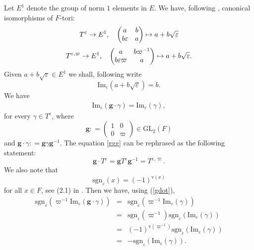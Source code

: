 \documentclass[11pt]{amsart}
\numberwithin{equation}{section}
\def\g{\mathbf{g}}
\def\sgn{\mathrm{sgn}}
\def\val{\mathrm{v}}
\def\GL{\mathrm{GL}}
\def\g{\mathbf{g}}
\newcommand{\<}{\left\langle}
\renewcommand{\>}{\right\rangle}
\begin{document}
Let $E^1$ denote the group of norm $1$ elements in $E$.   We have, following \cite[\S3.1]{ADSS}, canonical isomorphisms of $F$-tori:
\[
T^\varepsilon \to E^1, \quad \left(
\begin{matrix}
a&b\cr
b\varepsilon &a
\end{matrix}\right)
\mapsto a + b\sqrt\varepsilon
\]
\[
T^{\varepsilon, \varpi} \to E^1, \quad \left(
\begin{matrix}
a&b\varpi^{-1}\cr
b\varepsilon \varpi &a
\end{matrix}\right)
\mapsto a + b\sqrt\varepsilon.
\]
Given $a + b\sqrt \varepsilon \in E^1$ we shall, following \cite[\S3.1]{ADSS} write 
\[
\mathrm{Im}_\varepsilon(a + b\sqrt \varepsilon) = b.
\]  
We have
\begin{eqnarray}\label{gdot}
\mathrm{Im}_\varepsilon (\g \cdot \gamma) =  \mathrm{Im}_\varepsilon (\gamma),
\end{eqnarray}
for every $\gamma\in T^{\varepsilon}$, where 
\begin{equation} \label{eqn:g}
\mathbf{g}: = \left(
\begin{array}{cc}
1 & 0\\
0 & \varpi
\end{array}
\right) \in \GL_2(F)
\end{equation}
and $\mathbf{g} \cdot \gamma: = \mathbf{g} \gamma \mathbf{g}^{-1}$.
The equation \eqref{ggg} can be rephrased as the following statement:
\begin{equation} \label{eqn:tori}
\g \cdot T^\varepsilon =  \g T^\varepsilon \g^{-1} = T^{\varepsilon, \varpi}.
\end{equation}
We also note that
 \[
 \sgn_\varepsilon(x) = (-1)^{\val(x)}
 \]
 for all $x \in F$, see (2.1) in \cite {ADSS}. Then we have, using (\ref{gdot}),
 \begin{eqnarray}\label{SGN}
 \sgn_\varepsilon(\varpi^{-1} \mathrm{Im}_\varepsilon(\g \cdot \gamma))  &=& \sgn_\varepsilon(\varpi^{-1} \mathrm{Im}_\varepsilon(\gamma)) \\
  &=& \sgn_\varepsilon(\varpi^{-1}) \sgn_\varepsilon( \mathrm{Im}_\varepsilon(\gamma)) \nonumber \\
 &=& (-1)^{\val(\varpi^{-1})}\sgn_\varepsilon  (\mathrm{Im}_\varepsilon(\gamma)) \nonumber\\
 &=&- \sgn_\varepsilon( \mathrm{Im}_\varepsilon(\gamma)). \nonumber
 \end{eqnarray}
\end{document}
